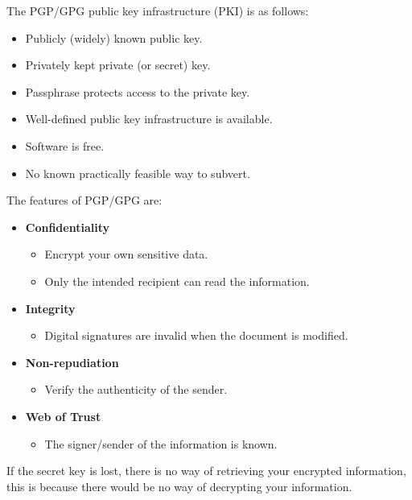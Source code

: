 \documentclass{article}
\begin{document}
The PGP/GPG public key infrastructure (PKI) is as follows:
\begin{itemize}
    \item Publicly (widely) known public key.
    \item Privately kept private (or secret) key.
    \item Passphrase protects access to the private key.
    \item Well-defined public key infrastructure is available.
    \item Software is free.
    \item No known practically feasible way to subvert.
\end{itemize}
The features of PGP/GPG are:
\begin{itemize}
    \item \textbf{Confidentiality}
    \begin{itemize}
        \item Encrypt your own sensitive data.
        \item Only the intended recipient can read the information.
    \end{itemize}
    \item \textbf{Integrity}
    \begin{itemize}
        \item Digital signatures are invalid when the document is modified.
    \end{itemize}
    \item \textbf{Non-repudiation}
    \begin{itemize}
        \item Verify the authenticity of the sender.
    \end{itemize}
    \item \textbf{Web of Trust}
    \begin{itemize}
        \item The signer/sender of the information is known.
    \end{itemize}
\end{itemize}

If the secret key is lost, there is no way of retrieving your encrypted information, this is because there would be no way of decrypting your information.
\end{document}
